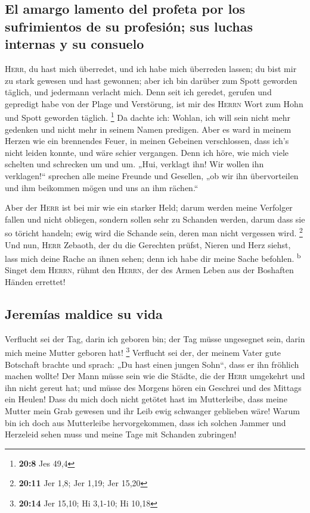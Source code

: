 \hypertarget{el-amargo-lamento-del-profeta-por-los-sufrimientos-de-su-profesiuxf3n-sus-luchas-internas-y-su-consuelo}{%
\subsection{El amargo lamento del profeta por los sufrimientos de su
profesión; sus luchas internas y su
consuelo}\label{el-amargo-lamento-del-profeta-por-los-sufrimientos-de-su-profesiuxf3n-sus-luchas-internas-y-su-consuelo}}

 \textsc{Herr}, du hast mich überredet, und ich habe mich
überreden lassen; du bist mir zu stark gewesen und hast gewonnen; aber
ich bin darüber zum Spott geworden täglich, und jedermann verlacht mich.
 Denn seit ich geredet, gerufen und gepredigt habe von der
Plage und Verstörung, ist mir des \textsc{Herrn} Wort zum Hohn und Spott
geworden täglich. \footnote{\textbf{20:8} Jes 49,4}  Da
dachte ich: Wohlan, ich will sein nicht mehr gedenken und nicht mehr in
seinem Namen predigen. Aber es ward in meinem Herzen wie ein brennendes
Feuer, in meinen Gebeinen verschlossen, dass ich's nicht leiden konnte,
und wäre schier vergangen.  Denn ich höre, wie mich viele
schelten und schrecken um und um. „Hui, verklagt ihn! Wir wollen ihn
verklagen!{}`` sprechen alle meine Freunde und Gesellen, „ob wir ihn
übervorteilen und ihm beikommen mögen und uns an ihm rächen.``

 Aber der \textsc{Herr} ist bei mir wie ein starker Held;
darum werden meine Verfolger fallen und nicht obliegen, sondern sollen
sehr zu Schanden werden, darum dass sie so töricht handeln; ewig wird
die Schande sein, deren man nicht vergessen wird. \footnote{\textbf{20:11}
  Jer 1,8; Jer 1,19; Jer 15,20}  Und nun, \textsc{Herr}
Zebaoth, der du die Gerechten prüfst, Nieren und Herz siehst, lass mich
deine Rache an ihnen sehen; denn ich habe dir meine Sache befohlen.
\textsuperscript{b}  Singet dem \textsc{Herrn}, rühmt den
\textsc{Herrn}, der des Armen Leben aus der Boshaften Händen errettet!

\hypertarget{jeremuxedas-maldice-su-vida}{%
\subsection{Jeremías maldice su
vida}\label{jeremuxedas-maldice-su-vida}}

 Verflucht sei der Tag, darin ich geboren bin; der Tag
müsse ungesegnet sein, darin mich meine Mutter geboren hat! \footnote{\textbf{20:14}
  Jer 15,10; Hi 3,1-10; Hi 10,18}  Verflucht sei der, der
meinem Vater gute Botschaft brachte und sprach: „Du hast einen jungen
Sohn``, dass er ihn fröhlich machen wollte!  Der Mann
müsse sein wie die Städte, die der \textsc{Herr} umgekehrt und ihn nicht
gereut hat; und müsse des Morgens hören ein Geschrei und des Mittags ein
Heulen!  Dass du mich doch nicht getötet hast im
Mutterleibe, dass meine Mutter mein Grab gewesen und ihr Leib ewig
schwanger geblieben wäre!  Warum bin ich doch aus
Mutterleibe hervorgekommen, dass ich solchen Jammer und Herzeleid sehen
muss und meine Tage mit Schanden zubringen!

